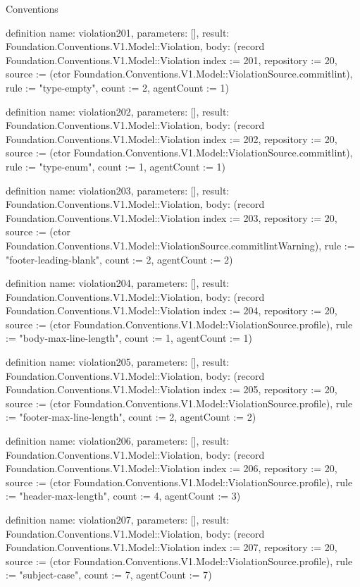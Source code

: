 \begin{lexlean}{Conventions}
\begin{semanticmodule}
definition{
  name: violation201,
  parameters: [],
  result: Foundation.Conventions.V1.Model::Violation,
  body: (record Foundation.Conventions.V1.Model::Violation {index := 201, repository := 20, source := (ctor Foundation.Conventions.V1.Model::ViolationSource.commitlint), rule := "type-empty", count := 2, agentCount := 1})
}

definition{
  name: violation202,
  parameters: [],
  result: Foundation.Conventions.V1.Model::Violation,
  body: (record Foundation.Conventions.V1.Model::Violation {index := 202, repository := 20, source := (ctor Foundation.Conventions.V1.Model::ViolationSource.commitlint), rule := "type-enum", count := 1, agentCount := 1})
}

definition{
  name: violation203,
  parameters: [],
  result: Foundation.Conventions.V1.Model::Violation,
  body: (record Foundation.Conventions.V1.Model::Violation {index := 203, repository := 20, source := (ctor Foundation.Conventions.V1.Model::ViolationSource.commitlintWarning), rule := "footer-leading-blank", count := 2, agentCount := 2})
}

definition{
  name: violation204,
  parameters: [],
  result: Foundation.Conventions.V1.Model::Violation,
  body: (record Foundation.Conventions.V1.Model::Violation {index := 204, repository := 20, source := (ctor Foundation.Conventions.V1.Model::ViolationSource.profile), rule := "body-max-line-length", count := 1, agentCount := 1})
}

definition{
  name: violation205,
  parameters: [],
  result: Foundation.Conventions.V1.Model::Violation,
  body: (record Foundation.Conventions.V1.Model::Violation {index := 205, repository := 20, source := (ctor Foundation.Conventions.V1.Model::ViolationSource.profile), rule := "footer-max-line-length", count := 2, agentCount := 2})
}

definition{
  name: violation206,
  parameters: [],
  result: Foundation.Conventions.V1.Model::Violation,
  body: (record Foundation.Conventions.V1.Model::Violation {index := 206, repository := 20, source := (ctor Foundation.Conventions.V1.Model::ViolationSource.profile), rule := "header-max-length", count := 4, agentCount := 3})
}

definition{
  name: violation207,
  parameters: [],
  result: Foundation.Conventions.V1.Model::Violation,
  body: (record Foundation.Conventions.V1.Model::Violation {index := 207, repository := 20, source := (ctor Foundation.Conventions.V1.Model::ViolationSource.profile), rule := "subject-case", count := 7, agentCount := 7})
}


\end{semanticmodule}
\end{lexlean}
